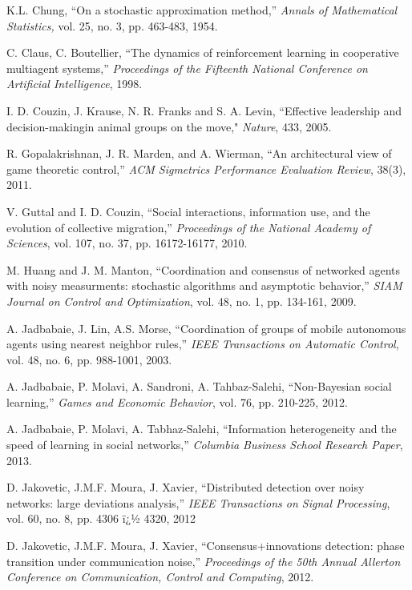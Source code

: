 \documentclass[final]{siamltex}
\begin{document}
\begin{thebibliography}{99}
 K.L. Chung, ``On a stochastic approximation method,'' {\em Annals of Mathematical
Statistics,} vol. 25, no. 3, pp. 463-483, 1954. 

 C. Claus, C. Boutellier, ``The dynamics of reinforcement learning in cooperative multiagent systems,'' 
{\em Proceedings of
the Fifteenth National Conference on Artificial Intelligence}, 1998.

 I. D. Couzin, J. Krause, N. R. Franks and S. A. Levin, ``Effective leadership and decision-makingin animal groups on the move," {\em Nature}, 433, 2005.

 R. Gopalakrishnan, J. R. Marden, and A. Wierman, ``An architectural view of game theoretic control,'' {\em ACM Sigmetrics Performance Evaluation Review}, 38(3), 2011.  

 V. Guttal and I. D. Couzin, ``Social interactions, information use, and the evolution of collective migration,'' {\em Proceedings of the National Academy of Sciences}, vol. 107, no. 37, pp. 16172-16177, 2010.

 M. Huang and J. M. Manton, ``Coordination and consensus of networked agents with noisy measurments: stochastic algorithms and
asymptotic behavior,'' {\em SIAM Journal on Control and Optimization}, vol. 48, no. 1, pp. 134-161,  2009. 

 A. Jadbabaie, J. Lin, A.S. Morse, ``Coordination of groups of mobile autonomous agents using nearest neighbor rules,'' 
{\em IEEE Transactions on Automatic Control}, vol. 48, no. 6, pp. 988-1001, 2003. 

 A. Jadbabaie, P. Molavi, A. Sandroni, A. Tahbaz-Salehi, ``Non-Bayesian social learning,'' {\em Games and Economic Behavior}, 
vol. 76, pp. 210-225, 2012.

 A. Jadbabaie, P. Molavi, A. Tabhaz-Salehi, ``Information heterogeneity and the speed of learning in social networks,''
{\em Columbia Business School Research Paper}, 2013. 

 D. Jakovetic, J.M.F. Moura, J. Xavier, ``Distributed detection over noisy networks: large deviations analysis,'' 
{\em IEEE Transactions on Signal Processing}, vol. 60, no. 8, pp. 4306 ï¿½ 4320, 2012

 D. Jakovetic, J.M.F. Moura, J. Xavier, ``Consensus+innovations detection: phase transition under communication noise,''
{\em Proceedings of the 50th Annual Allerton Conference on Communication, Control and Computing}, 2012. 


\end{thebibliography}
\end{document}
